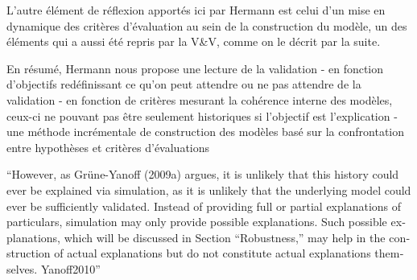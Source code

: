 



L'autre élément de réflexion apportés ici par Hermann est celui d'un mise en dynamique des critères d'évaluation au sein de la construction du modèle, un des éléments qui a aussi été repris par la V\&V, comme on le décrit par la suite.


En résumé, Hermann nous propose une lecture de la validation
- en fonction d'objectifs redéfinissant ce qu'on peut attendre ou ne pas attendre de la validation
- en fonction de critères mesurant la cohérence interne des modèles, ceux-ci ne pouvant pas être seulement historiques si l'objectif est l'explication
- une méthode incrémentale de construction des modèles basé sur la confrontation entre hypothèses et critères d'évaluations











\foreignquote{english}{However, as Grüne-Yanoff (2009a) argues, it is unlikely that this history could ever be explained via simulation, as it is unlikely that the underlying model could ever be sufficiently validated. Instead of providing full or partial explanations of particulars, simulation may only provide possible explanations. Such possible explanations, which will be discussed in Section “Robustness,” may help in the construction of actual explanations but do not constitute actual explanations themselves. Yanoff2010}




